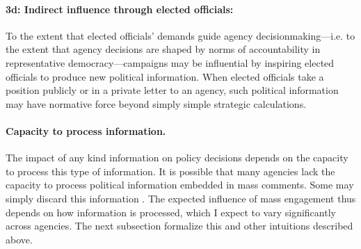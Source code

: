 \paragraph{3d: Indirect influence through elected officials:} 
To the extent that elected officials' demands guide agency decisionmaking---i.e. to the extent that agency decisions are shaped by norms of accountability in representative democracy---campaigns may be influential by inspiring elected officials to produce new political information. When elected officials take a position publicly or in a private letter to an agency, such political information may have normative force beyond simply simple strategic calculations.


\paragraph{Capacity to process information.} The impact of any kind information on policy decisions depends on the capacity to process this type of information.
It is possible that many agencies lack the capacity to process political information embedded in mass comments. Some may simply discard this information \citep{Mendelson2011}. The expected influence of mass engagement thus depends on how information is processed, which I expect to vary significantly across agencies. The next subsection formalize this and other intuitions described above.






 






